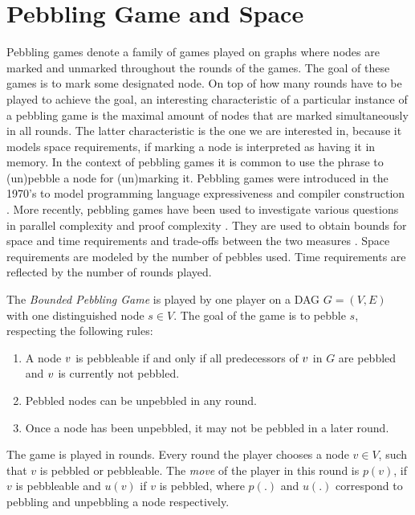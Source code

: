 \section{Pebbling Game and Space}
\label{sec:pebbling-game}

Pebbling games denote a family of games played on graphs where nodes are marked and unmarked throughout the rounds of the games.
The goal of these games is to mark some designated node.
On top of how many rounds have to be played to achieve the goal, an interesting characteristic of a particular instance of a pebbling game is the maximal amount of nodes that are marked simultaneously in all rounds.
The latter characteristic is the one we are interested in, because it models space requirements, if marking a node is interpreted as having it in memory.
In the context of pebbling games it is common to use the phrase to (un)pebble a node for (un)marking it.
Pebbling games were introduced in the 1970's to model programming language expressiveness \cite{Pippenger1980,Walker1973} and compiler construction \cite{Sethi1975}. 
More recently, pebbling games have been used to investigate various questions in parallel complexity \cite{Chan2013} and proof complexity \cite{Ben-Sasson2009,Esteban2001,Nordstroem2009}. 
They are used to obtain bounds for space and time requirements and trade-offs between the two measures \cite{EmdeBoas1979,Ben-Sasson2002}.
Space requirements are modeled by the number of pebbles used. 
Time requirements are reflected by the number of rounds played.

\begin{definition}
\label{def:pebbling-game}
The \emph{Bounded Pebbling Game} is played by one player on a DAG $G = (V,E)$ with one distinguished node $s \in V$.
The goal of the game is to pebble $s$, respecting the following rules:
\begin{enumerate}
	\item \label{rule:premises} A node $v$ is pebbleable if and only if all predecessors of $v$ in $G$ are pebbled and $v$ is currently not pebbled.
	\item \label{rule:unpebbling} Pebbled nodes can be unpebbled in any round.
	\item \label{rule:onlyonce} Once a node has been unpebbled, it may not be pebbled in a later round.
\end{enumerate}
The game is played in rounds.
Every round the player chooses a node $v \in V$, such that $v$ is pebbled or pebbleable.
The \emph{move} of the player in this round is $p(v)$, if $v$ is pebbleable and $u(v)$ if $v$ is pebbled, where $p(.)$ and $u(.)$ correspond to pebbling and unpebbling a node respectively.

\end{definition}

